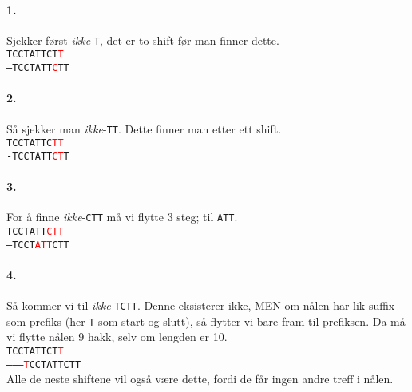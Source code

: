 \documentclass[11pt,a4paper]{article}
\theoremstyle{def}
\begin{document}
\begin{minipage}{0.5\textwidth}
\paragraph{1.} Sjekker først \textit{ikke}-\texttt{T}, det er to shift før man finner dette.
\\
\noindent\texttt{TCCTATTCT\textcolor{red}{T}}\\
\texttt{--TCCTATT\textcolor{red}{C}TT}
\\
\paragraph{2.} Så sjekker man \textit{ikke}-\texttt{TT}. Dette finner man etter ett shift.
\\
\noindent\texttt{TCCTATTC\textcolor{red}{TT}}\\
\texttt{-TCCTATT\textcolor{red}{CT}T}
\\
\paragraph{3.} For å finne \textit{ikke}-\texttt{CTT} må vi flytte 3 steg; til \texttt{ATT}.
\\
\noindent\texttt{TCCTATT\textcolor{red}{CTT}}\\
\texttt{---TCCT\textcolor{red}{ATT}CTT}
\end{minipage}
\hspace{10pt}
\begin{minipage}{0.5\textwidth}
\paragraph{4.} Så kommer vi til \textit{ikke}-\texttt{TCTT}. Denne eksisterer ikke, MEN om nålen har lik suffix som prefiks (her \texttt{T} som start og slutt), så flytter vi bare fram til prefiksen. Da må vi flytte nålen 9 hakk, selv om lengden er 10.
\\
\noindent\texttt{TCCTATTCT\textcolor{red}{T}}\\
\texttt{---------\textcolor{red}{T}CCTATTCTT}
\\
Alle de neste shiftene vil også være dette, fordi de får ingen andre treff i nålen.
\end{minipage}

\vspace{10pt}
\end{document}
